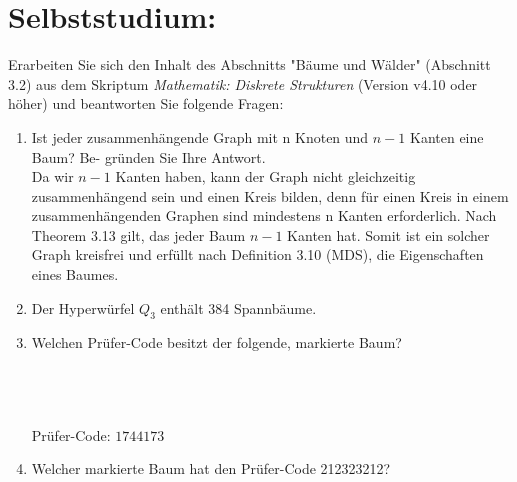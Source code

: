    \section*{Selbststudium:}
        Erarbeiten Sie sich den Inhalt des Abschnitts "Bäume und Wälder" (Abschnitt 3.2) aus dem
        Skriptum \textit{Mathematik: Diskrete Strukturen} (Version v4.10 oder höher) und beantworten Sie
        folgende Fragen:
    \begin{enumerate}[label=(\alph*)]
        \item Ist jeder zusammenhängende Graph mit n Knoten und $n - 1$ Kanten eine Baum? Be-
        gründen Sie Ihre Antwort.\\
        Da wir $n-1$ Kanten haben, kann der Graph nicht gleichzeitig zusammenhängend sein und einen Kreis bilden, denn für einen Kreis in einem zusammenhängenden Graphen sind mindestens n Kanten erforderlich. Nach Theorem 3.13 gilt, das jeder Baum $n-1$ Kanten hat. Somit ist ein solcher Graph kreisfrei und erfüllt nach Definition 3.10 (MDS), die Eigenschaften eines Baumes. 

        \item Der Hyperwürfel $Q_3$ enthält 384 Spannbäume. %

        \item Welchen Prüfer-Code besitzt der folgende, markierte Baum?\\\\
        \\\\
        Prüfer-Code: $1744173$

        \item Welcher markierte Baum hat den Prüfer-Code 212323212?\\\\
\end{enumerate}
